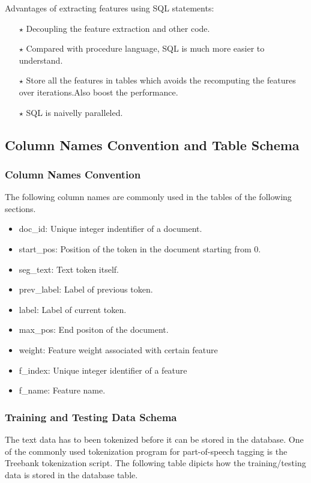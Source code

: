 Advantages of extracting features using SQL statements:
\begin{itemize}
\item [$\star$] Decoupling the feature extraction and other code.
\item [$\star$] Compared with procedure language, SQL is much more easier to understand.
\item [$\star$] Store all the features in tables which avoids the recomputing the features over iterations.Also boost the performance.
\item [$\star$] SQL is naivelly paralleled.
\end{itemize}

\subsection{Column Names Convention and Table Schema}
\subsubsection{Column Names Convention}
The following column names are commonly used in the tables of the following sections.
\begin{itemize}
\item doc\_id: Unique integer indentifier of a document.
\item start\_pos: Position of the token in the document starting from 0.
\item seg\_text: Text token itself.
\item prev\_label: Label of previous token.
\item label: Label of current token.
\item max\_pos: End positon of the document.
\item weight: Feature weight associated with certain feature
\item f\_index: Unique integer identifier of a feature
\item f\_name: Feature name. 
\end{itemize}

\subsubsection{Training and Testing Data Schema}
The text data has to been tokenized before it can be stored in the database. One of the commonly used tokenization program for part-of-speech 
tagging is the Treebank tokenization script.
The following table dipicts how the training/testing data is stored in the database table. 

